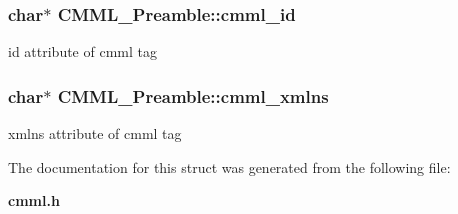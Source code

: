 \subsubsection{\setlength{\rightskip}{0pt plus 5cm}char$\ast$ {\bf CMML\_\-Preamble::cmml\_\-id}}\label{structCMML__Preamble_o6}


id attribute of cmml tag 
\subsubsection{\setlength{\rightskip}{0pt plus 5cm}char$\ast$ {\bf CMML\_\-Preamble::cmml\_\-xmlns}}\label{structCMML__Preamble_o7}


xmlns attribute of cmml tag 

The documentation for this struct was generated from the following file:\begin{CompactItemize}
\item 
{\bf cmml.h}\end{CompactItemize}
